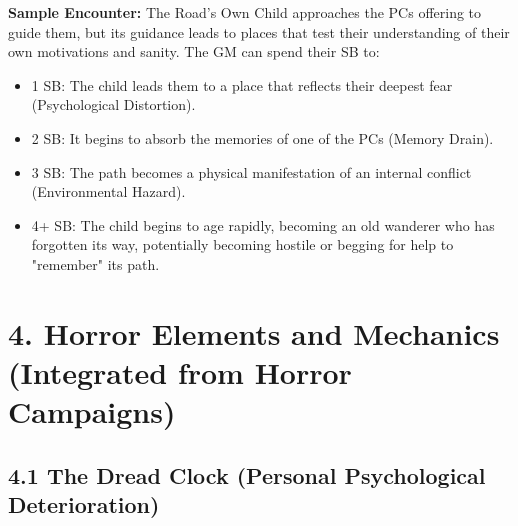 \documentclass[11pt]{article}
\begin{document}
\textbf{Sample Encounter:} The Road's Own Child approaches the PCs offering to guide them, but its guidance leads to places that test their understanding of their own motivations and sanity. The GM can spend their SB to:
\begin{itemize}
\item 1 SB: The child leads them to a place that reflects their deepest fear (Psychological Distortion).
\item 2 SB: It begins to absorb the memories of one of the PCs (Memory Drain).
\item 3 SB: The path becomes a physical manifestation of an internal conflict (Environmental Hazard).
\item 4+ SB: The child begins to age rapidly, becoming an old wanderer who has forgotten its way, potentially becoming hostile or begging for help to "remember" its path.
\end{itemize}

\clearpage

\section*{4. Horror Elements and Mechanics (Integrated from Horror Campaigns)}

\subsection*{4.1 The Dread Clock (Personal Psychological Deterioration)}
\end{document}
